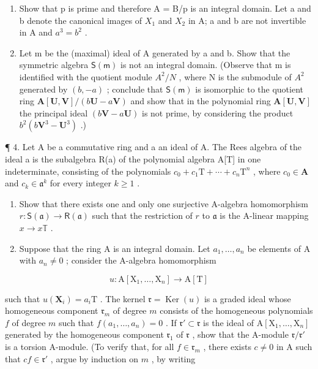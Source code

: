\begin{enumerate}
\def\labelenumi{(\alph{enumi})}
\item
  Show that p is prime and therefore A = B/p is an integral domain. Let a and b denote the canonical images of \(X_{1}\) and \(X_{2}\) in A; a and b are not invertible in A and \(a^{3} = b^{2}\) .
\item
  Let m be the (maximal) ideal of A generated by a and b. Show that the symmetric algebra \(\mathsf{S}(\mathsf{m})\) is not an integral domain. (Observe that m is identified with the quotient module \(A^{2}/N\) , where N is the submodule of \(A^{2}\) generated by \((b, -a)\) ; conclude that \(\mathsf{S}(\mathsf{m})\) is isomorphic to the quotient ring \(\mathbf{A}[\mathbf{U}, \mathbf{V}]/(b\mathbf{U} - a\mathbf{V})\) and show that in the polynomial ring \(\mathbf{A}[\mathbf{U}, \mathbf{V}]\) the principal ideal \((b\mathbf{V} - a\mathbf{U})\) is not prime, by considering the product \(b^{2}(b\mathbf{V}^{3} - \mathbf{U}^{3})\) .)
\end{enumerate}

¶ 4. Let A be a commutative ring and a an ideal of A. The Rees algebra of the ideal a is the subalgebra R(a) of the polynomial algebra A{[}T{]} in one indeterminate, consisting of the polynomials \(c_{0} + c_{1}\mathrm{T} + \cdots + c_{n}\mathrm{T}^{n}\) , where \(c_{0} \in \mathbf{A}\) and \(c_{k} \in \mathfrak{a}^{k}\) for every integer \(k \geqslant 1\) .

\begin{enumerate}
\def\labelenumi{(\alph{enumi})}
\item
  Show that there exists one and only one surjective A-algebra homomorphism \(r: \mathsf{S}(\mathfrak{a}) \to \mathsf{R}(\mathfrak{a})\) such that the restriction of \(r\) to \(\mathfrak{a}\) is the A-linear mapping \(x \to x\mathbb{T}\) .
\item
  Suppose that the ring A is an integral domain. Let \(a_1, \ldots, a_n\) be elements of A with \(a_n \neq 0\) ; consider the A-algebra homomorphism
\end{enumerate}

\[
u: \mathrm{A} [ \mathrm{X} _ {1}, \dots , \mathrm{X} _ {n} ] \rightarrow \mathrm{A} [ \mathrm{T} ]
\]

such that \(u(\mathbf{X}_i) = a_i\mathrm{T}\) . The kernel \(\mathfrak{r} = \operatorname{Ker}(u)\) is a graded ideal whose homogeneous component \(\mathfrak{r}_m\) of degree \(m\) consists of the homogeneous polynomials \(f\) of degree \(m\) such that \(f(a_1, \ldots, a_n) = 0\) . If \(\mathfrak{r}' \subset \mathfrak{r}\) is the ideal of \(\mathrm{A}[\mathrm{X}_1, \ldots, \mathrm{X}_n]\) generated by the homogeneous component \(\mathfrak{r}_1\) of \(\mathfrak{r}\) , show that the A-module \(\mathfrak{r}/\mathfrak{r}'\) is a torsion A-module. (To verify that, for all \(f \in \mathfrak{r}_m\) , there exists \(c \neq 0\) in A such that \(cf \in \mathfrak{r}'\) , argue by induction on \(m\) , by writing

